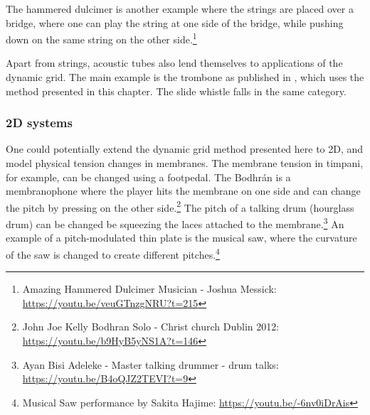 The hammered dulcimer is another example where the strings are placed over a bridge, where one can play the string at one side of the bridge, while pushing down on the same string on the other side.\footnote{Amazing Hammered Dulcimer Musician - Joshua Messick: \url{https://youtu.be/veuGTnzgNRU?t=215}}

Apart from strings, acoustic tubes also lend themselves to applications of the dynamic grid. The main example is the trombone as published in \citeP[H], which uses the method presented in this chapter. The slide whistle falls in the same category. 

\subsubsection{2D systems}
One could potentially extend the dynamic grid method presented here to 2D, and model physical tension changes in membranes. The membrane tension in timpani, for example, can be changed using a footpedal. The Bodhr\'an is a membranophone where the player hits the membrane on one side and can change the pitch by pressing on the other side.\footnote{John Joe Kelly Bodhran Solo - Christ church Dublin 2012: \url{https://youtu.be/b9HyB5yNS1A?t=146}} The pitch of a talking drum (hourglass drum) can be changed be squeezing the laces attached to the membrane.\footnote{Ayan Bisi Adeleke - Master talking drummer - drum talks: \url{https://youtu.be/B4oQJZ2TEVI?t=9}} An example of a pitch-modulated thin plate is the musical saw, where the curvature of the saw is changed to create different pitches.\footnote{Musical Saw performance by Sakita Hajime: \url{https://youtu.be/-6nv0iDrAis}}







